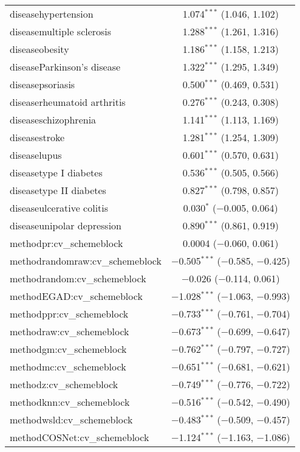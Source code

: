 \begin{table}[!htbp]
\begin{tabular}{@{\extracolsep{5pt}}lc}
  diseasehypertension & 1.074$^{***}$ (1.046, 1.102) \\ 
  diseasemultiple sclerosis & 1.288$^{***}$ (1.261, 1.316) \\ 
  diseaseobesity & 1.186$^{***}$ (1.158, 1.213) \\ 
  diseaseParkinson's disease & 1.322$^{***}$ (1.295, 1.349) \\ 
  diseasepsoriasis & 0.500$^{***}$ (0.469, 0.531) \\ 
  diseaserheumatoid arthritis & 0.276$^{***}$ (0.243, 0.308) \\ 
  diseaseschizophrenia & 1.141$^{***}$ (1.113, 1.169) \\ 
  diseasestroke & 1.281$^{***}$ (1.254, 1.309) \\ 
  diseaselupus & 0.601$^{***}$ (0.570, 0.631) \\ 
  diseasetype I diabetes & 0.536$^{***}$ (0.505, 0.566) \\ 
  diseasetype II diabetes & 0.827$^{***}$ (0.798, 0.857) \\ 
  diseaseulcerative colitis & 0.030$^{*}$ ($-$0.005, 0.064) \\ 
  diseaseunipolar depression & 0.890$^{***}$ (0.861, 0.919) \\ 
  methodpr:cv\_schemeblock & 0.0004 ($-$0.060, 0.061) \\ 
  methodrandomraw:cv\_schemeblock & $-$0.505$^{***}$ ($-$0.585, $-$0.425) \\ 
  methodrandom:cv\_schemeblock & $-$0.026 ($-$0.114, 0.061) \\ 
  methodEGAD:cv\_schemeblock & $-$1.028$^{***}$ ($-$1.063, $-$0.993) \\ 
  methodppr:cv\_schemeblock & $-$0.733$^{***}$ ($-$0.761, $-$0.704) \\ 
  methodraw:cv\_schemeblock & $-$0.673$^{***}$ ($-$0.699, $-$0.647) \\ 
  methodgm:cv\_schemeblock & $-$0.762$^{***}$ ($-$0.797, $-$0.727) \\ 
  methodmc:cv\_schemeblock & $-$0.651$^{***}$ ($-$0.681, $-$0.621) \\ 
  methodz:cv\_schemeblock & $-$0.749$^{***}$ ($-$0.776, $-$0.722) \\ 
  methodknn:cv\_schemeblock & $-$0.516$^{***}$ ($-$0.542, $-$0.490) \\ 
  methodwsld:cv\_schemeblock & $-$0.483$^{***}$ ($-$0.509, $-$0.457) \\ 
  methodCOSNet:cv\_schemeblock & $-$1.124$^{***}$ ($-$1.163, $-$1.086) \\ 

\end{tabular}
\end{table}
